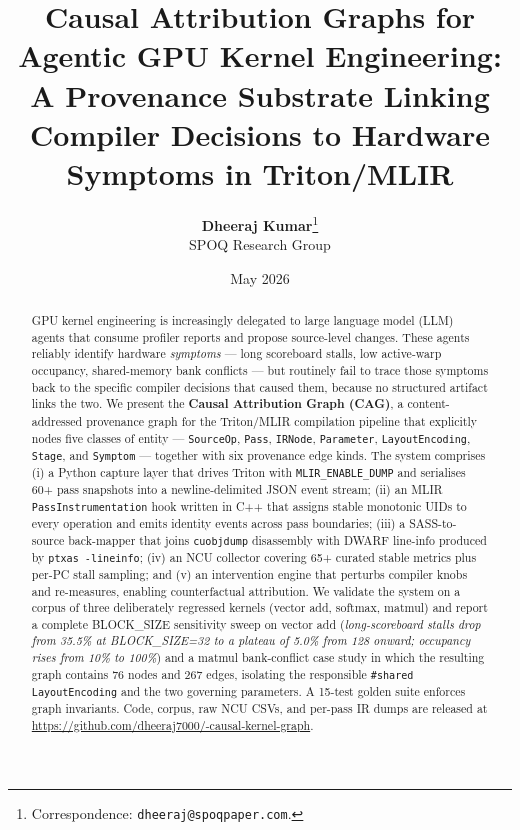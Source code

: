 \documentclass[10pt]{article}
\title{\Large\bfseries Causal Attribution Graphs for Agentic GPU Kernel Engineering:\\
A Provenance Substrate Linking Compiler Decisions to Hardware Symptoms in Triton/MLIR}
\author{
  \textbf{Dheeraj Kumar}\thanks{Correspondence: \texttt{dheeraj@spoqpaper.com}.}\\
  SPOQ Research Group\\
}
\date{May 2026}
\begin{document}
\maketitle

\begin{abstract}
\noindent
GPU kernel engineering is increasingly delegated to large language model (LLM) agents that consume profiler reports and propose source-level changes. These agents reliably identify hardware \emph{symptoms} --- long scoreboard stalls, low active-warp occupancy, shared-memory bank conflicts --- but routinely fail to trace those symptoms back to the specific compiler decisions that caused them, because no structured artifact links the two. We present the \textbf{Causal Attribution Graph (CAG)}, a content-addressed provenance graph for the Triton/MLIR compilation pipeline that explicitly nodes five classes of entity --- \texttt{SourceOp}, \texttt{Pass}, \texttt{IRNode}, \texttt{Parameter}, \texttt{LayoutEncoding}, \texttt{Stage}, and \texttt{Symptom} --- together with six provenance edge kinds. The system comprises (i) a Python capture layer that drives Triton with \texttt{MLIR\_ENABLE\_DUMP} and serialises 60+ pass snapshots into a newline-delimited JSON event stream; (ii) an MLIR \texttt{PassInstrumentation} hook written in C++ that assigns stable monotonic UIDs to every operation and emits identity events across pass boundaries; (iii) a SASS-to-source back-mapper that joins \texttt{cuobjdump} disassembly with DWARF line-info produced by \texttt{ptxas -lineinfo}; (iv) an NCU collector covering 65+ curated stable metrics plus per-PC stall sampling; and (v) an intervention engine that perturbs compiler knobs and re-measures, enabling counterfactual attribution. We validate the system on a corpus of three deliberately regressed kernels (vector add, softmax, matmul) and report a complete BLOCK\_SIZE sensitivity sweep on vector add (\emph{long-scoreboard stalls drop from 35.5\% at BLOCK\_SIZE=32 to a plateau of 5.0\% from 128 onward; occupancy rises from 10\% to 100\%}) and a matmul bank-conflict case study in which the resulting graph contains 76 nodes and 267 edges, isolating the responsible \texttt{\#shared} \texttt{LayoutEncoding} and the two governing parameters. A 15-test golden suite enforces graph invariants. Code, corpus, raw NCU CSVs, and per-pass IR dumps are released at \url{https://github.com/dheeraj7000/-causal-kernel-graph}.
\end{abstract}

\end{document}
